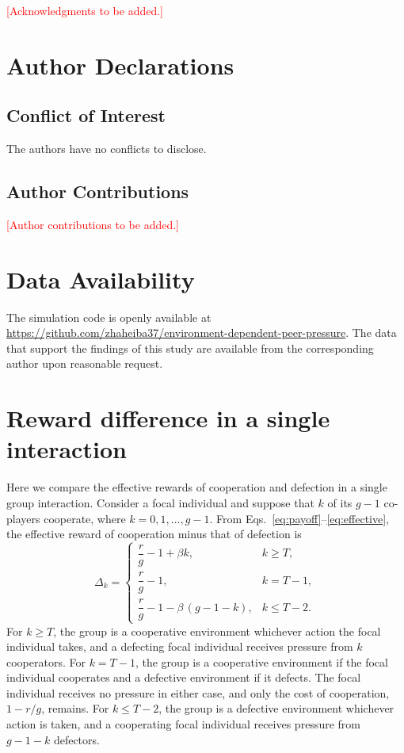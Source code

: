 \documentclass[%
  aip,cha,
  amsmath,amssymb,
  reprint,
  floatfix,
  article-title,
]{revtex4-2}
\newcommand{\AQ}[1]{\textcolor{red}{[#1]}}
\begin{document}
\begin{acknowledgments}
\AQ{Acknowledgments to be added.}
\end{acknowledgments}

\section*{Author Declarations}

\subsection*{Conflict of Interest}
The authors have no conflicts to disclose.

\subsection*{Author Contributions}
\AQ{Author contributions to be added.}

\section*{Data Availability}
The simulation code is openly available at \url{https://github.com/zhaheiba37/environment-dependent-peer-pressure}. The data that support the findings of this study are available from the corresponding author upon reasonable request.

\appendix*
\section{Reward difference in a single interaction}\label{sec:appendix}

Here we compare the effective rewards of cooperation and defection in a single group interaction. Consider a focal individual and suppose that $k$ of its $g-1$ co-players cooperate, where $k=0,1,\dots,g-1$. From Eqs.~\eqref{eq:payoff}--\eqref{eq:effective}, the effective reward of cooperation minus that of defection is
\begin{equation}
\Delta_k=
\begin{cases}
\dfrac{r}{g}-1+\beta k, & k\geq T,\\[1.5ex]
\dfrac{r}{g}-1, & k=T-1,\\[1.5ex]
\dfrac{r}{g}-1-\beta\,(g-1-k), & k\leq T-2.
\end{cases}
\label{eq:delta}
\end{equation}
For $k\geq T$, the group is a cooperative environment whichever action the focal individual takes, and a defecting focal individual receives pressure from $k$ cooperators. For $k=T-1$, the group is a cooperative environment if the focal individual cooperates and a defective environment if it defects. The focal individual receives no pressure in either case, and only the cost of cooperation, $1-r/g$, remains. For $k\leq T-2$, the group is a defective environment whichever action is taken, and a cooperating focal individual receives pressure from $g-1-k$ defectors.
\end{document}
